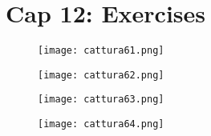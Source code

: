 \documentclass{article}
\begin{document}
\section{Cap 12: Exercises}
\begin{figure}[H]
  \centering
  \texttt{[image: cattura61.png]}
\end{figure}
\begin{figure}[H]
  \centering
  \texttt{[image: cattura62.png]}
\end{figure}
\begin{figure}[H]
  \centering
  \texttt{[image: cattura63.png]}
\end{figure}
\begin{figure}[H]
  \centering
  \texttt{[image: cattura64.png]}
\end{figure}
\end{document}
